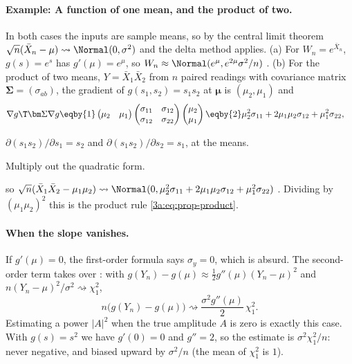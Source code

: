 \paragraph{Example: A function of one mean, and the product of two.}
\label{3a:ex:delta}
In both cases the inputs are sample means, so by the central limit theorem
$\sqrt n(\bar X_n-\mu)\rightsquigarrow\Normal(0,\sigma^2)$ and the delta
method applies. (a) For $W_n=e^{\bar X_n}$, $g(s)=e^s$ has
$g'(\mu)=e^\mu$, so $W_n\approx\Normal(e^\mu,e^{2\mu}\sigma^2/n)$
. (b) For the product of two means,
$Y=\bar X_1\bar X_2$ from $n$ paired readings with covariance matrix
$\bm\Sigma=(\sigma_{ab})$, the gradient of $g(s_1,s_2)=s_1s_2$ at $\bm\mu$ is
$(\mu_2,\mu_1)$ and
\begin{align*}
  \nabla g\T\bm\Sigma\nabla g
  &\eqby{1} \begin{pmatrix}\mu_2&\mu_1\end{pmatrix}
            \begin{pmatrix}\sigma_{11}&\sigma_{12}\\\sigma_{12}&\sigma_{22}\end{pmatrix}
            \begin{pmatrix}\mu_2\\\mu_1\end{pmatrix}
   \eqby{2} \mu_2^2\sigma_{11}+2\mu_1\mu_2\sigma_{12}+\mu_1^2\sigma_{22},
\end{align*}
\begin{explain}
  \item $\partial(s_1s_2)/\partial s_1=s_2$ and $\partial(s_1s_2)/\partial s_2=s_1$, at the means.
  \item Multiply out the quadratic form.
\end{explain}
so $\sqrt n(\bar X_1\bar X_2-\mu_1\mu_2)\rightsquigarrow\Normal(0,\mu_2^2\sigma_{11}+2\mu_1\mu_2\sigma_{12}+\mu_1^2\sigma_{22})$
. Dividing by $(\mu_1\mu_2)^2$ this is the product rule
\eqref{3a:eq:prop-product}.

\paragraph{When the slope vanishes.}
If $g'(\mu)=0$, the first-order formula says $\sigma_y=0$, which is absurd.
The second-order term takes over : with
$g(Y_n)-g(\mu)\approx\frac12g''(\mu)(Y_n-\mu)^2$ and
$n(Y_n-\mu)^2/\sigma^2\rightsquigarrow\chi^2_1$,
\begin{equation}
  n\bigl(g(Y_n)-g(\mu)\bigr)\rightsquigarrow\frac{\sigma^2g''(\mu)}{2}\,\chi^2_1 .
  \label{3a:eq:second-order-delta}
\end{equation}
Estimating a power $|A|^2$ when the true amplitude $A$ is zero is exactly this
case. With $g(s)=s^2$ we have $g'(0)=0$ and $g''=2$, so the estimate is
$\sigma^2\chi^2_1/n$: never negative, and biased upward by $\sigma^2/n$
(the mean of $\chi^2_1$ is $1$).

